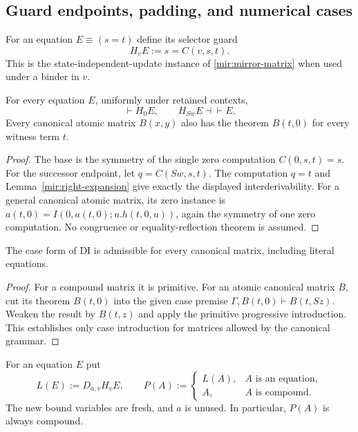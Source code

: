 \subsection{Guard endpoints, padding, and numerical cases}

For an equation $E\equiv(s=t)$ define its selector guard
\[
                  H_vE:=s=C(v,s,t).
                  \tag{Selector guard}\label{mir:selector-guard}
\]
This is the state-independent-update instance of
\eqref{mir:mirror-matrix} when used under a binder in $v$.

\begin{lemma}\label{mir:guard-endpoints}
For every equation $E$, uniformly under retained contexts,
\[
                   \vdash H_0E,
                   \qquad H_{Sw}E\dashv\vdash E.
\]
Every canonical atomic matrix $B(x,y)$ also has the theorem $B(t,0)$
for every witness term $t$.
\end{lemma}
\begin{proof}
The base is the symmetry of the single zero computation
$C(0,s,t)=s$. For the successor endpoint, let $q=C(Sw,s,t)$.
The computation $q=t$ and Lemma~\ref{mir:right-expansion} give exactly
the displayed interderivability. For a general canonical atomic matrix,
its zero instance is
$a(t,0)=I(0,a(t,0);u.h(t,0,u))$, again the symmetry of one zero
computation. No congruence or equality-reflection theorem is assumed.
\end{proof}

\begin{lemma}
\label{mir:canonical-cases}
The case form of DI is admissible for every canonical matrix, including
literal equations.
\end{lemma}
\begin{proof}
For a compound matrix it is primitive. For an atomic canonical matrix
$B$, cut its theorem $B(t,0)$ into the given case premise
$\Gamma,B(t,0)\vdash B(t,Sz)$. Weaken the result by $B(t,z)$ and
apply the primitive progressive introduction. This establishes only
case introduction for matrices allowed by the canonical grammar.
\end{proof}

For an equation $E$ put
\[
 L(E):=D_{a,v}H_vE,
 \qquad
 P(A):=\begin{cases}L(A),&A\text{ is an equation},\\A,&A\text{ is compound}.
 \end{cases}
 \tag{Padding}\label{mir:padding-def}
\]
The new bound variables are fresh, and $a$ is unused. In particular,
$P(A)$ is always compound.

